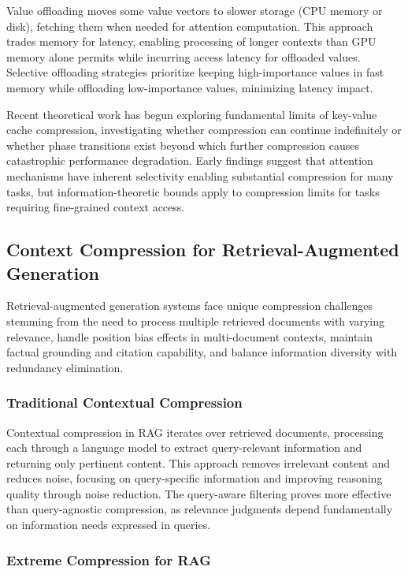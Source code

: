 Value offloading moves some value vectors to slower storage (CPU memory or disk), fetching them when needed for attention computation. This approach trades memory for latency, enabling processing of longer contexts than GPU memory alone permits while incurring access latency for offloaded values. Selective offloading strategies prioritize keeping high-importance values in fast memory while offloading low-importance values, minimizing latency impact.

Recent theoretical work has begun exploring fundamental limits of key-value cache compression, investigating whether compression can continue indefinitely or whether phase transitions exist beyond which further compression causes catastrophic performance degradation. Early findings suggest that attention mechanisms have inherent selectivity enabling substantial compression for many tasks, but information-theoretic bounds apply to compression limits for tasks requiring fine-grained context access.

\subsection{Context Compression for Retrieval-Augmented Generation}

Retrieval-augmented generation systems face unique compression challenges stemming from the need to process multiple retrieved documents with varying relevance, handle position bias effects in multi-document contexts, maintain factual grounding and citation capability, and balance information diversity with redundancy elimination.

\subsubsection{Traditional Contextual Compression}

Contextual compression in RAG iterates over retrieved documents, processing each through a language model to extract query-relevant information and returning only pertinent content. This approach removes irrelevant content and reduces noise, focusing on query-specific information and improving reasoning quality through noise reduction. The query-aware filtering proves more effective than query-agnostic compression, as relevance judgments depend fundamentally on information needs expressed in queries.

\subsubsection{Extreme Compression for RAG}

